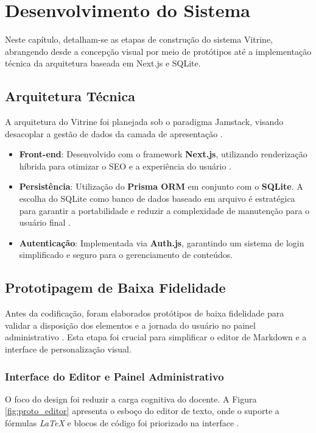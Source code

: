 \chapter{Desenvolvimento do Sistema}\label{cap:devSistema}

Neste capítulo, detalham-se as etapas de construção do sistema Vitrine, abrangendo desde a concepção visual por meio de protótipos até a implementação técnica da arquitetura baseada em Next.js e SQLite.

\section{Arquitetura Técnica}

A arquitetura do Vitrine foi planejada sob o paradigma Jamstack, visando desacoplar a gestão de dados da camada de apresentação \cite{nextjs_docs}. 
\begin{itemize}
    \item \textbf{Front-end}: Desenvolvido com o framework \textbf{Next.js}, utilizando renderização híbrida para otimizar o SEO e a experiência do usuário \cite{nextjs_docs}.
    \item \textbf{Persistência}: Utilização do \textbf{Prisma ORM} em conjunto com o \textbf{SQLite}. A escolha do SQLite como banco de dados baseado em arquivo é estratégica para garantir a portabilidade e reduzir a complexidade de manutenção para o usuário final \cite{prisma_docs}.
    \item \textbf{Autenticação}: Implementada via \textbf{Auth.js}, garantindo um sistema de login simplificado e seguro para o gerenciamento de conteúdos.
\end{itemize}

\section{Prototipagem de Baixa Fidelidade}

Antes da codificação, foram elaborados protótipos de baixa fidelidade para validar a disposição dos elementos e a jornada do usuário no painel administrativo \cite{Sommerville2011}. Esta etapa foi crucial para simplificar o editor de Markdown e a interface de personalização visual.

\subsection{Interface do Editor e Painel Administrativo}

O foco do design foi reduzir a carga cognitiva do docente. A Figura \ref{fig:proto_editor} apresenta o esboço do editor de texto, onde o suporte a fórmulas \textit{LaTeX} e blocos de código foi priorizado na interface \cite{Sommerville2011}.

